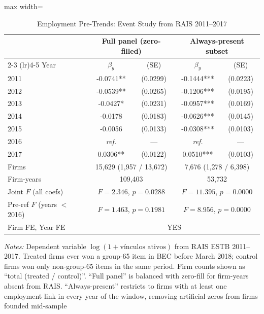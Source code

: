 \begin{table}[htbp]
\centering
\caption{Employment Pre-Trends: Event Study from RAIS 2011--2017}
\label{tab:pretrends}
\begin{adjustbox}{max width=\textwidth}
\begin{threeparttable}
\small
\begin{tabular}{lcccc}
\toprule
 & \multicolumn{2}{c}{Full panel (zero-filled)} & \multicolumn{2}{c}{Always-present subset} \\
\cmidrule(lr){2-3} \cmidrule(lr){4-5}
 Year & $\beta_y$ & (SE) & $\beta_y$ & (SE) \\
\midrule
2011 & -0.0741** & (0.0299) & -0.1444*** & (0.0223) \\
2012 & -0.0539** & (0.0265) & -0.1206*** & (0.0195) \\
2013 & -0.0427* & (0.0231) & -0.0957*** & (0.0169) \\
2014 & -0.0178 & (0.0183) & -0.0626*** & (0.0145) \\
2015 & -0.0056 & (0.0133) & -0.0308*** & (0.0103) \\
2016 & \textit{ref.} & --- & \textit{ref.} & --- \\
2017 & 0.0306** & (0.0122) & 0.0510*** & (0.0103) \\
\midrule
Firms & \multicolumn{2}{c}{15,629 (1,957 / 13,672)} & \multicolumn{2}{c}{7,676 (1,278 / 6,398)} \\
Firm-years & \multicolumn{2}{c}{109,403} & \multicolumn{2}{c}{53,732} \\
Joint $F$ (all coefs) & \multicolumn{2}{c}{$F = 2.346$, $p = 0.0288$} & \multicolumn{2}{c}{$F = 11.395$, $p = 0.0000$} \\
Pre-ref $F$ (years $<$ 2016) & \multicolumn{2}{c}{$F = 1.463$, $p = 0.1981$} & \multicolumn{2}{c}{$F = 8.956$, $p = 0.0000$} \\
Firm FE, Year FE & \multicolumn{4}{c}{YES} \\
\bottomrule
\end{tabular}
\begin{tablenotes}
\small
\item \textit{Notes:} Dependent variable $\log(1 + \text{vínculos ativos})$
from RAIS ESTB 2011--2017. Treated firms ever won a group-65 item in
BEC before March 2018; control firms won only non-group-65 items in the same period.
Firm counts shown as ``total (treated / control)''.
``Full panel'' is balanced with zero-fill for firm-years absent from RAIS.
``Always-present'' restricts to firms with at least one employment link in every
year of the window, removing artificial zeros from firms founded mid-sample

\end{tablenotes}
\end{threeparttable}
\end{adjustbox}
\end{table}
